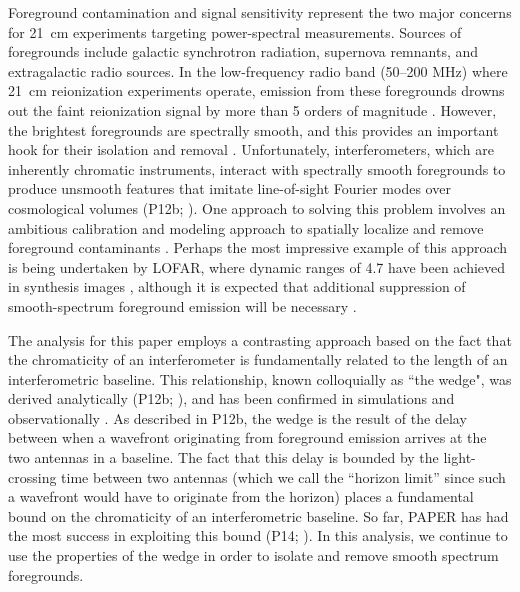 \documentclass[twocolumn,numberedappendix]{emulateapj} \shorttitle{PSA64}
\begin{document}
Foreground contamination and signal sensitivity represent the two major concerns for 21~cm
experiments targeting power-spectral measurements. Sources of foregrounds include
galactic synchrotron radiation, supernova remnants, and extragalactic radio sources.
In the low-frequency radio band (50--200 MHz) where 21~cm reionization experiments operate,
emission from these foregrounds
drowns out the faint reionization signal by more than 5 orders of magnitude
\citep{deoliveira2008,jelic_et_al2008,santos_et_al2005}.
However, the brightest foregrounds are spectrally smooth, and this provides an important hook
for their isolation and removal \citep{liu_tegmark2012,petrovic_oh2011,liu_et_al2009}.  Unfortunately, interferometers, which are inherently chromatic
instruments, interact with spectrally smooth foregrounds to produce unsmooth features that
imitate line-of-sight Fourier modes over cosmological volumes (P12b; \citealt{bowman_et_al2009,morales_et_al2006a}).
One approach to solving this problem involves an ambitious calibration and modeling approach to spatially localize and
remove foreground contaminants \citep{chapman_et_al2013,sullivan_et_al2012,harker_et_al2009,liu_et_al2008,bowman_et_al2008}.
Perhaps the most impressive example of this approach is being undertaken by LOFAR, where dynamic ranges of 4.7 have
been achieved in synthesis images \citep{yatawatta_et_al2013}, although it is expected that additional
suppression of smooth-spectrum foreground emission will be necessary \citep{chapman_et_al2013}.

The analysis for this paper employs a contrasting
approach based on the fact that the chromaticity of an interferometer
is fundamentally related to the length of an interferometric baseline.  This relationship, known
colloquially as ``the wedge", was 
derived analytically (P12b; \citealt{vedantham_et_al2012}), and has been confirmed in 
simulations \citep{datta_et_al2010,hazelton_et_al2013} and observationally
\citep{pober_et_al2013,dillon_et_al2013b}.  As described in P12b, the wedge is the result of the delay
between when a wavefront originating from foreground emission
arrives at the two antennas in a baseline.  The fact that this delay is bounded by the light-crossing
time between two antennas (which we call the ``horizon limit'' since such a wavefront would have to 
originate from the horizon) places a fundamental bound on the chromaticity of
an interferometric baseline.  So far, PAPER has had the most success in exploiting this bound
(P14; \citealt{jacobs_et_al2014}). 
In this analysis, we continue to use the properties of the 
wedge in order to isolate and remove smooth
spectrum foregrounds.
\end{document}
